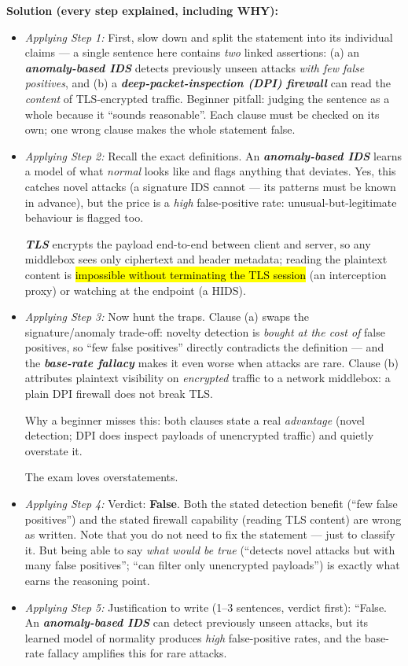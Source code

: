 \documentclass[12pt, a4paper]{article}
\newcommand{\term}[1]{\textbf{\textit{#1}}}        %
\newcommand{\imp}[1]{\hl{#1}}                       %
\begin{document}
\textbf{Solution (every step explained, including WHY):}
\begin{itemize}
    \item \textit{Applying Step 1:} First, slow down and split the statement into its individual claims --- a single sentence here contains \emph{two} linked assertions: (a) an \term{anomaly-based IDS} detects previously unseen attacks \emph{with few false positives}, and (b) a \term{deep-packet-inspection (DPI) firewall} can read the \emph{content} of TLS-encrypted traffic.
    Beginner pitfall: judging the sentence as a whole because it ``sounds reasonable''. Each clause must be checked on its own; one wrong clause makes the whole statement false.
    \item \textit{Applying Step 2:} Recall the exact definitions. An \term{anomaly-based IDS} learns a model of what \emph{normal} looks like and flags anything that deviates.
    Yes, this catches novel attacks (a signature IDS cannot --- its patterns must be known in advance), but the price is a \emph{high} false-positive rate: unusual-but-legitimate behaviour is flagged too.

    \term{TLS} encrypts the payload end-to-end between client and server, so any middlebox sees only ciphertext and header metadata; reading the plaintext content is \imp{impossible without terminating the TLS session} (an interception proxy) or watching at the endpoint (a HIDS).
    \item \textit{Applying Step 3:} Now hunt the traps. Clause (a) swaps the signature/anomaly trade-off: novelty detection is \emph{bought at the cost of} false positives, so ``few false positives'' directly contradicts the definition --- and the \term{base-rate fallacy} makes it even worse when attacks are rare.
    Clause (b) attributes plaintext visibility on \emph{encrypted} traffic to a network middlebox: a plain DPI firewall does not break TLS.

    Why a beginner misses this: both clauses state a real \emph{advantage} (novel detection; DPI does inspect payloads of unencrypted traffic) and quietly overstate it.

    The exam loves overstatements.
    \item \textit{Applying Step 4:} Verdict: \textbf{False}. Both the stated detection benefit (``few false positives'') and the stated firewall capability (reading TLS content) are wrong as written.
    Note that you do not need to fix the statement --- just to classify it. But being able to say \emph{what would be true} (``detects novel attacks but with many false positives''; ``can filter only unencrypted payloads'') is exactly what earns the reasoning point.
    \item \textit{Applying Step 5:} Justification to write (1--3 sentences, verdict first): ``False. An \term{anomaly-based IDS} can detect previously unseen attacks, but its learned model of normality produces \emph{high} false-positive rates, and the base-rate fallacy amplifies this for rare attacks.


\end{itemize}
\end{document}
